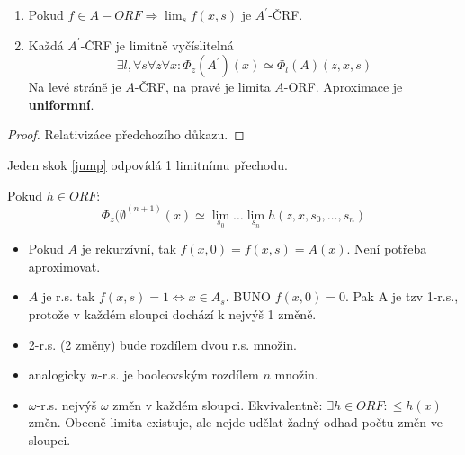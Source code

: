 \begin{theorem}
	\begin{enumerate}
		\item Pokud $f \in A-ORF \Rightarrow \lim_s f(x, s)$ je $A^{\prime}$-ČRF.
		\item Každá $A^{\prime}$-ČRF je limitně vyčíslitelná
			\[ \exists l, \forall s \forall z \forall x: \Phi_z(A^{\prime})(x) \simeq \Phi_l(A)(z, x, s) \]
			Na levé stráně je $A$-ČRF, na pravé je limita $A$-ORF.
			Aproximace je \textbf{uniformní}.
	\end{enumerate}
\end{theorem}
\begin{proof}
	Relativizáce předchozího důkazu.
\end{proof}

\begin{consequence}
	Jeden skok \cref{jump} odpovídá 1 limitnímu přechodu.
\end{consequence}

\begin{theorem}
	Pokud $h \in ORF$:
	\[ \Phi_z(\emptyset^{(n + 1)}(x) \simeq \lim_{s_0} \ldots \lim_{s_n} h(z, x, s_0, \ldots, s_n) \]
\end{theorem}

\begin{note}
	\begin{itemize}
		\item Pokud $A$ je rekurzívní, tak $f(x, 0) = f(x, s) = A(x)$.
	Není potřeba aproximovat.
	\item $A$ je r.s. tak $f(x, s) = 1 \iff x \in A_s$. BUNO $f(x, 0) = 0$.
		Pak A je tzv 1-r.s., protože v každém sloupci dochází k nejvýš 1 změně.
	\item 2-r.s. (2 změny) bude rozdílem dvou r.s. množin.
	\item analogicky $n$-r.s. je booleovským rozdílem $n$ množin.
	\item $\omega$-r.s. nejvýš $\omega$ změn v každém sloupci.
		Ekvivalentně: $\exists h \in ORF: \leq h(x)$ změn.
		Obecně limita existuje, ale nejde udělat žadný odhad počtu změn ve sloupci.
	\end{itemize}
\end{note}
